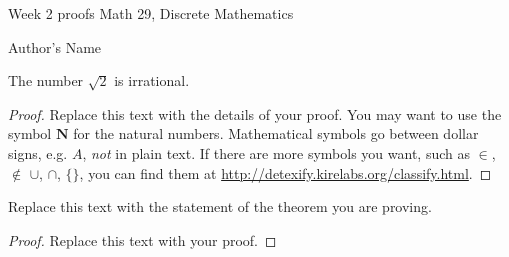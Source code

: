 \documentclass{article}
\newenvironment{theorem}[2][Theorem]{\begin{trivlist}
\item[\hskip \labelsep {\bfseries #1}\hskip \labelsep {\bfseries #2.}]}{\end{trivlist}}
\newenvironment{claim}[2][Claim]{\begin{trivlist}
\item[\hskip \labelsep {\bfseries #1}\hskip \labelsep {\bfseries #2.}]}{\end{trivlist}}
\begin{document}
\large %
\linespread{1.5} %


{\Large Week 2 proofs %
\hfill  Math 29, Discrete Mathematics}

\begin{center}
{\Large Author's Name} %
\end{center}
\vspace{0.05in}

%

\begin{claim}{(Page P1 $\#$ 2)}
The number $\sqrt{2}$ is irrational.
\end{claim}

\begin{proof}
Replace this text with the details of your proof. You may want to use the symbol $\mathbf{N}$ for the natural numbers. Mathematical symbols go between dollar signs, e.g. $A$, \emph{not} in plain text. If there are more symbols you want, such as $\in$, $\notin$ $\cup$, $\cap$, $\{ \}$, you can find them at \url{http://detexify.kirelabs.org/classify.html}.
\end{proof}


\vspace{1in} %


\begin{theorem}{(Page P1 $\#$ 7)}
Replace this text with the statement of the theorem you are proving.
\end{theorem}

\begin{proof}
Replace this text with your proof.
\end{proof}

\end{document}
